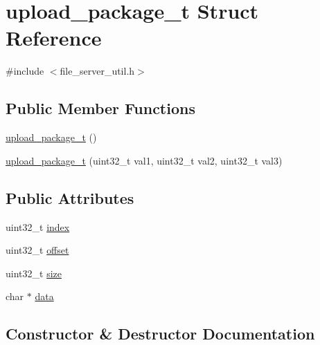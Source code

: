 \hypertarget{structupload__package__t}{}\section{upload\+\_\+package\+\_\+t Struct Reference}
\label{structupload__package__t}


{\ttfamily \#include $<$file\+\_\+server\+\_\+util.\+h$>$}

\subsection*{Public Member Functions}
\begin{DoxyCompactItemize}
\item 
\hyperlink{structupload__package__t_a54c40b468257c069d9ed6404a10f68a0}{upload\+\_\+package\+\_\+t} ()
\item 
\hyperlink{structupload__package__t_ab53565b3b9466d0e9bd126f130bc7227}{upload\+\_\+package\+\_\+t} (uint32\+\_\+t val1, uint32\+\_\+t val2, uint32\+\_\+t val3)
\end{DoxyCompactItemize}
\subsection*{Public Attributes}
\begin{DoxyCompactItemize}
\item 
uint32\+\_\+t \hyperlink{structupload__package__t_a2a238584592e184ae312d951d25ed8ba}{index}
\item 
uint32\+\_\+t \hyperlink{structupload__package__t_ab4a75c13d807d9b3d2b917f7e0ead2ec}{offset}
\item 
uint32\+\_\+t \hyperlink{structupload__package__t_acc8ac6adcca8cfd35a48184ffd6b4a9c}{size}
\item 
char $\ast$ \hyperlink{structupload__package__t_abee1c8451f48a619aa6c9b67f7981290}{data}
\end{DoxyCompactItemize}


\subsection{Constructor \& Destructor Documentation}
\hypertarget{structupload__package__t_a54c40b468257c069d9ed6404a10f68a0}{}
